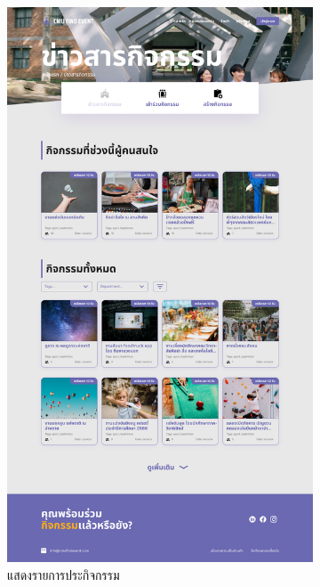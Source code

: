 \begin{figure}[h]
  \centering
  \begin{subfigure}[b]{0.3\linewidth}
    \includegraphics[width=\linewidth]{image/Figma-design/Event-info.png}
    \caption{แสดงรายการประกิจกรรม}
  \end{subfigure}
  \hfill
  \begin{subfigure}[b]{0.3\linewidth}

\end{subfigure}
\end{figure}
